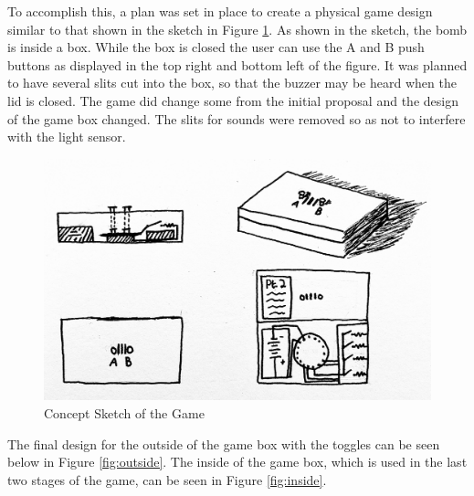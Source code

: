 \documentclass[12pt]{article}
\begin{document}
To accomplish this, a plan was set in place to create a physical game design similar to that shown in the sketch in Figure \ref{fig:sketch}.  As shown in the sketch, the bomb is inside a box.  While the box is closed the user can use the A and B push buttons as displayed in the top right and bottom left of the figure. It was planned to have several slits cut into the box, so that the buzzer may be heard when the lid is closed.  The game did change some from the initial proposal and the design of the game box changed.  The slits for sounds were removed so as not to interfere with the light sensor.
\begin{figure}[h!]
    \centering
    \includegraphics[width=4.5in]{IMG-2090.jpg}
    \caption{Concept Sketch of the Game}
    \label{fig:sketch}
\end{figure}

The final design for the outside of the game box with the toggles can be seen below in Figure \ref{fig:outside}.  The inside of the game box, which is used in the last two stages of the game, can be seen in Figure \ref{fig:inside}. 
\end{document}
